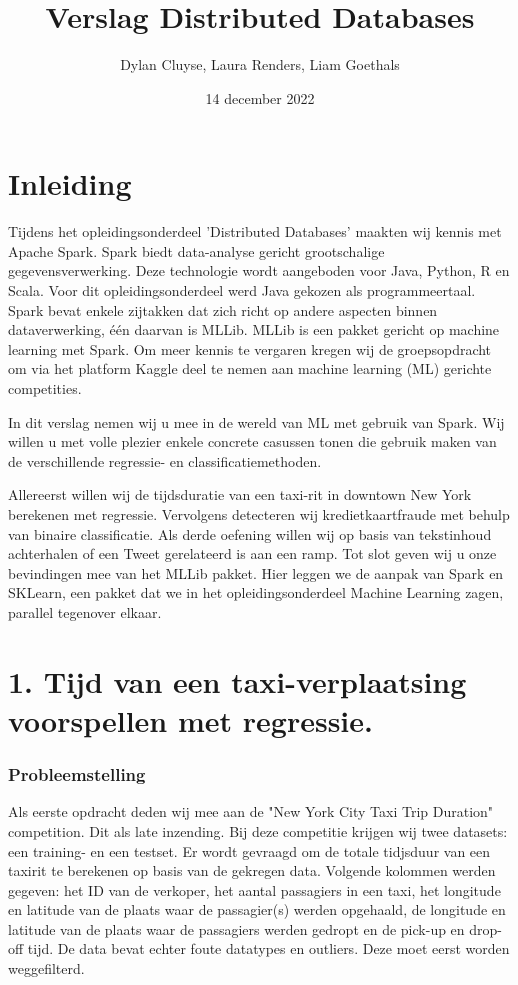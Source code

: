 \documentclass[a4paper,12pt,twoside]{report}
\title{Verslag Distributed Databases}
\author{Dylan {Cluyse}, Laura {Renders}, Liam {Goethals}}
\date{14 december 2022}
\begin{document}
\maketitle

\tableofcontents

\chapter*{Inleiding}

Tijdens het opleidingsonderdeel 'Distributed Databases' maakten wij kennis met Apache Spark. Spark biedt data-analyse gericht grootschalige gegevensverwerking. Deze technologie wordt aangeboden voor Java, Python, R en Scala. Voor dit opleidingsonderdeel werd Java gekozen als programmeertaal. Spark bevat enkele zijtakken dat zich richt op andere aspecten binnen dataverwerking, één daarvan is MLLib. MLLib is een pakket gericht op machine learning met Spark. Om meer kennis te vergaren kregen wij de groepsopdracht om via het platform Kaggle deel te nemen aan machine learning (ML) gerichte competities.

In dit verslag nemen wij u mee in de wereld van ML met gebruik van Spark. Wij willen u met volle plezier enkele concrete casussen tonen die gebruik maken van de verschillende regressie- en classificatiemethoden.

Allereerst willen wij de tijdsduratie van een taxi-rit in downtown New York berekenen met regressie. Vervolgens detecteren wij kredietkaartfraude met behulp van binaire classificatie. Als derde oefening willen wij op basis van tekstinhoud achterhalen of een Tweet gerelateerd is aan een ramp. Tot slot geven wij u onze bevindingen mee van het MLLib pakket. Hier leggen we de aanpak van Spark en SKLearn, een pakket dat we in het opleidingsonderdeel Machine Learning zagen, parallel tegenover elkaar.

\chapter*{1. Tijd van een taxi-verplaatsing voorspellen met regressie.}


\subsection*{Probleemstelling}

Als eerste opdracht deden wij mee aan de "New York City Taxi Trip Duration" competition. Dit als late inzending. Bij deze competitie krijgen wij twee datasets: een training- en een testset. Er wordt gevraagd om de totale tidjsduur van een taxirit te berekenen op basis van de gekregen data. Volgende kolommen werden gegeven: het ID van de verkoper, het aantal passagiers in een taxi, het longitude en latitude van de plaats waar de passagier(s) werden opgehaald, de longitude en latitude van de plaats waar de passagiers werden gedropt en de pick-up en drop-off tijd. De data bevat echter foute datatypes en outliers. Deze moet eerst worden weggefilterd.
\end{document}
